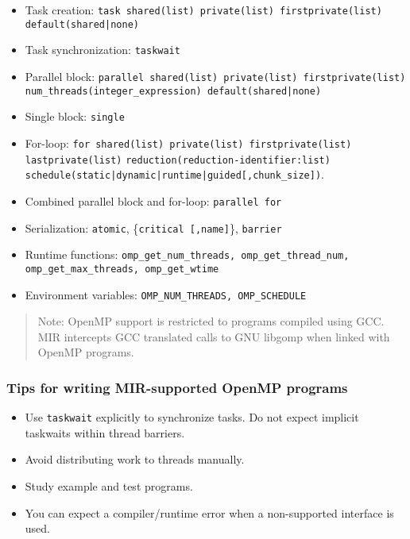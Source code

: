 \documentclass[11pt,a4paper]{article}
\begin{document}
\begin{itemize}
    \item Task creation: \texttt{task shared(list) private(list) firstprivate(list) default(shared|none)}
    \item Task synchronization: \texttt{taskwait}
    \item Parallel block: \texttt{parallel shared(list) private(list) firstprivate(list) num\_threads(integer\_expression) default(shared|none)}
    \item Single block: \texttt{single}
    \item For-loop: \texttt{for shared(list) private(list) firstprivate(list) lastprivate(list)} \texttt{reduction(reduction-identifier:list)} \\ \texttt{schedule(static|dynamic|runtime|guided[,chunk\_size])}.
    \item Combined parallel block and for-loop: \texttt{parallel for}
    \item Serialization: \texttt{atomic}, \{\texttt{critical [,name]}\}, \texttt{barrier}
    \item Runtime functions: \texttt{omp\_get\_num\_threads, omp\_get\_thread\_num, \\omp\_get\_max\_threads, omp\_get\_wtime}
    \item Environment variables: \texttt{OMP\_NUM\_THREADS, OMP\_SCHEDULE}
\end{itemize}

\begin{framed}
\begin{quote}
Note: OpenMP support is restricted to programs compiled using GCC. MIR intercepts GCC translated calls to GNU libgomp when linked with OpenMP programs.
\end{quote}
\end{framed}

\subsubsection{Tips for writing MIR-supported OpenMP programs}\label{tips-for-writing-mir-supported-openmp-programs}

\begin{itemize}
    \item Use \texttt{taskwait} explicitly to synchronize tasks. Do not expect implicit taskwaits within thread barriers.
        \item Avoid distributing work to threads manually.
        \item Study example and test programs.
        \item You can expect a compiler/runtime error when a non-supported interface is used.
\end{itemize}
\end{document}
